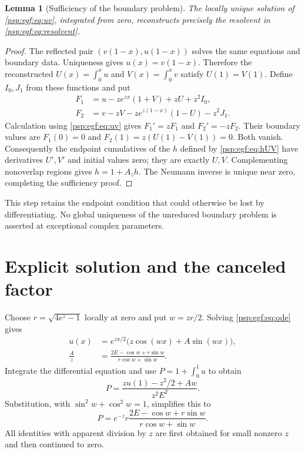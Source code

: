 \documentclass[11pt,letterpaper]{article}
\numberwithin{equation}{section}
\newtheorem{lemma}[theorem]{Lemma}
\theoremstyle{remark}\newtheorem{remark}[theorem]{Remark}
\begin{document}
\begin{lemma}[Sufficiency of the boundary problem]\label{psp:egf:lem:sufficiency}
The locally unique solution of \eqref{psp:egf:eq:uv}, integrated from zero,
reconstructs precisely the resolvent in \eqref{psp:egf:eq:resolvent}.
\end{lemma}
\begin{proof}
The reflected pair $(v(1-x),u(1-x))$ solves the same equations and boundary
data. Uniqueness gives $u(x)=v(1-x)$. Therefore the reconstructed
$U(x)=\int_0^xu$ and $V(x)=\int_0^xv$ satisfy $U(1)=V(1)$.
Define $I_0,J_1$ from these functions and put
\begin{align*}
 F_1&=u-ze^{zx}(1+V)+zU+z^2I_0,\\
 F_2&=v-zV-ze^{z(1-x)}(1-U)-z^2J_1.
\end{align*}
Calculation using \eqref{psp:egf:eq:uv} gives $F_1'=zF_1$ and $F_2'=-zF_2$.
Their boundary values are $F_1(0)=0$ and
$F_2(1)=z(U(1)-V(1))=0$. Both vanish. Consequently the endpoint
cumulatives of the $h$ defined by \eqref{psp:egf:eq:hUV} have derivatives
$U',V'$ and initial values zero; they are exactly $U,V$.
Complementing nonoverlap regions gives $h=1+A_zh$. The Neumann inverse
is unique near zero, completing the sufficiency proof.
\end{proof}
This step retains the endpoint condition that could otherwise be lost
by differentiating. No global uniqueness of the unreduced boundary
problem is asserted at exceptional complex parameters.

\section{Explicit solution and the canceled factor}\label{psp:egf:sec:cancellation}
Choose $r=\sqrt{4e^z-1}$ locally at zero and put $w=zr/2$. Solving
\eqref{psp:egf:eq:ode} gives
\begin{align}
 u(x)&=e^{zx/2}\bigl(z\cos(wx)+A\sin(wx)\bigr),\label{psp:egf:eq:usolution}\\
 \frac Az&=\frac{2E-\cos w+r\sin w}{r\cos w+\sin w}.
 \label{psp:egf:eq:A}
\end{align}
Integrate the differential equation and use $P=1+\int_0^1u$ to obtain
\begin{equation}\label{psp:egf:eq:integrated}
 P=\frac{zu(1)-z^2/2+Aw}{z^2E^2}.
\end{equation}
Substitution, with $\sin^2w+\cos^2w=1$, simplifies this to
\begin{equation}\label{psp:egf:eq:fullangle}
 P=e^{-z}r\frac{2E-\cos w+r\sin w}{r\cos w+\sin w}.
\end{equation}
All identities with apparent division by $z$ are first obtained for
small nonzero $z$ and then continued to zero.
\end{document}
